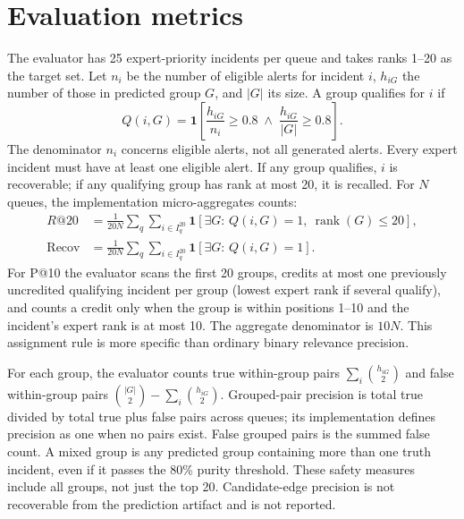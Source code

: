 \section{Evaluation metrics}
The evaluator has 25 expert-priority incidents per queue and takes ranks 1--20 as the target set. Let $n_i$ be the number of eligible alerts for incident $i$, $h_{iG}$ the number of those in predicted group $G$, and $|G|$ its size. A group qualifies for $i$ if
\begin{equation}\label{eq:qualify}Q(i,G)=\mathbf{1}\left[\frac{h_{iG}}{n_i}\geq0.8\;\land\;\frac{h_{iG}}{|G|}\geq0.8\right].\end{equation}
The denominator $n_i$ concerns eligible alerts, not all generated alerts. Every expert incident must have at least one eligible alert. If any group qualifies, $i$ is recoverable; if any qualifying group has rank at most 20, it is recalled. For $N$ queues, the implementation micro-aggregates counts:
\begin{align}\label{eq:recall}
R@20&=\frac{1}{20N}\sum_q\sum_{i\in I_q^{20}}\mathbf1[\exists G:\,Q(i,G)=1,\ \operatorname{rank}(G)\leq20],\\
\operatorname{Recov}&=\frac{1}{20N}\sum_q\sum_{i\in I_q^{20}}\mathbf1[\exists G:\,Q(i,G)=1].
\end{align}
For P@10 the evaluator scans the first 20 groups, credits at most one previously uncredited qualifying incident per group (lowest expert rank if several qualify), and counts a credit only when the group is within positions 1--10 and the incident's expert rank is at most 10. The aggregate denominator is $10N$. This assignment rule is more specific than ordinary binary relevance precision.

For each group, the evaluator counts true within-group pairs $\sum_i\binom{h_{iG}}2$ and false within-group pairs $\binom{|G|}2-\sum_i\binom{h_{iG}}2$. Grouped-pair precision is total true divided by total true plus false pairs across queues; its implementation defines precision as one when no pairs exist. False grouped pairs is the summed false count. A mixed group is any predicted group containing more than one truth incident, even if it passes the 80\% purity threshold. These safety measures include all groups, not just the top 20. Candidate-edge precision is not recoverable from the prediction artifact and is not reported.
